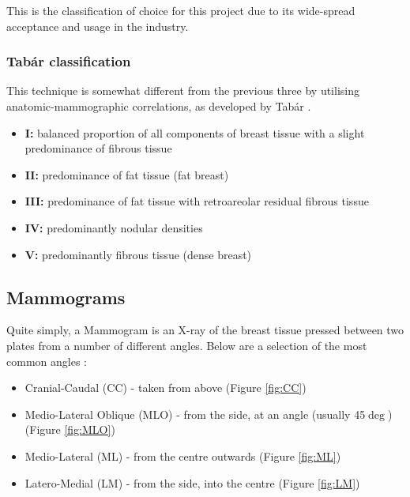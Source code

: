 This is the classification of choice for this project due to its wide-spread acceptance and usage in the industry.

\vspace{1cm}
\subsubsection{Tab\'ar classification}

This technique is somewhat different from the previous three by utilising anatomic-mammographic correlations, as developed by Tab\'ar \cite{al}.

\begin{itemize}
  \item \textbf{I: } balanced proportion of all components of breast tissue with a slight predominance of fibrous tissue
  \item \textbf{II: } predominance of fat tissue (fat breast)
  \item \textbf{III: } predominance of fat tissue with retroareolar residual fibrous tissue
  \item \textbf{IV: } predominantly nodular densities
  \item \textbf{V: } predominantly fibrous tissue (dense breast)
\end{itemize}

\subsection{Mammograms}

Quite simply, a Mammogram is an X-ray of the breast tissue pressed between two plates from a number of different angles. Below are a selection of the most common angles \cite{Radswiki} \cite{Mammography_views_Doc_2016}:
\begin{itemize}
  \item Cranial-Caudal (CC) - taken from above (Figure \ref{fig:CC})
  \item Medio-Lateral Oblique (MLO) - from the side, at an angle (usually 45$\deg$) (Figure \ref{fig:MLO})
  \item Medio-Lateral (ML) - from the centre outwards (Figure \ref{fig:ML})
  \item Latero-Medial (LM) - from the side, into the centre (Figure \ref{fig:LM})
\end{itemize}

